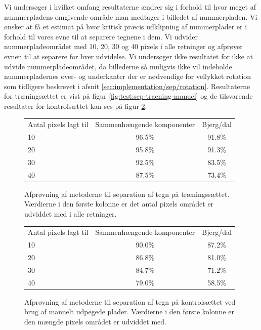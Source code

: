 Vi undersøger i hvilket omfang resultaterne ændrer sig i forhold til hvor meget af nummerpladens omgivende område man medtager i billedet af nummerpladen. Vi ønsker at få et estimat på hvor kritisk præcis udklipning af nummerplader er i forhold til vores evne til at separere tegnene i dem. Vi udvider nummerpladeområdet med 10, 20, 30 og 40 pixels i alle retninger og afprøver evnen til at separere for hver udvidelse. Vi undersøger ikke resultatet for ikke at udvide nummerpladeområdet, da billederne så muligvis ikke vil indeholde nummerpladernes over- og underkanter der er nødvendige for vellykket rotation som tidligere beskrevet i afsnit \vref{sec:implementation/sep/rotation}. Resultaterne for træningsættet er vist på figur \vref{fig:test:sep-traening-manuel} og de tilsvarende resultater for kontrolsættet kan ses på figur \ref{fig:test:sep-kontrol-manuel}.

\begin{figure}[htp]
\centering
\begin{tabular}{|l|c|c|}\hline
\rowcolor[gray]{0.9} \multicolumn{3}{|>{\columncolor[gray]{0.9}}c|}{\textbf{Separation af tegn - Træningssæt}} \\ \hline
Antal pixels lagt til & Sammenhængende komponenter & Bjerg/dal \\\hline
10 & 96.5\% & 91.8\% \\\hline
20 & 95.8\% & 91.3\% \\\hline
30 & 92.5\% & 83.5\% \\\hline
40 & 87.5\% & 73.4\% \\\hline \end{tabular}
\caption{Afprøvning af metoderne til separation af tegn på træningssættet. Værdierne i den første kolonne er det antal pixels området er udviddet med i alle retninger.}
\label{fig:test:sep-traening-manuel}
\end{figure}

\begin{figure}[htp]
\centering
\begin{tabular}{|l|c|c|}\hline
\rowcolor[gray]{0.9} \multicolumn{3}{|>{\columncolor[gray]{0.9}}c|}{\textbf{Separation af tegn - Kontrolsæt}} \\ \hline
Antal pixels lagt til & Sammenhængende komponenter & Bjerg/dal \\\hline
10 & 90.0\% & 87.2\% \\\hline
20 & 86.8\% & 81.0\% \\\hline
30 & 84.7\% & 71.2\% \\\hline
40 & 79.0\% & 58.5\% \\\hline \end{tabular}
\caption{Afprøvning af metoderne til separation af tegn på kontrolsættet ved brug af manuelt udpegede plader. Værdierne i den første kolonne er den mængde pixels området er udviddet med.}
\label{fig:test:sep-kontrol-manuel}
\end{figure}

